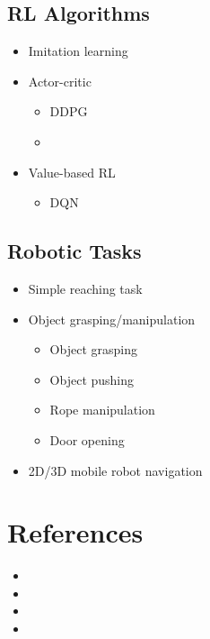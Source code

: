 \subsection{RL Algorithms}
\begin{itemize}
	\item Imitation learning \cite{pathak2018zero}
	\item Actor-critic
	\begin{itemize}
		\item DDPG \cite{andrychowicz2017hindsight}
		\item \cite{chane2021goal}
	\end{itemize}
	\item Value-based RL
	\begin{itemize}
		\item DQN \cite{andrychowicz2017hindsight, nair2018visual}
	\end{itemize}
\end{itemize}

\subsection{Robotic Tasks}
\begin{itemize}
	\item Simple reaching task
	\item Object grasping/manipulation
	\begin{itemize}
		\item Object grasping \cite{andrychowicz2017hindsight, nair2018visual}
		\item Object pushing \cite{andrychowicz2017hindsight, nair2018visual, chane2021goal}
		\item Rope manipulation \cite{pathak2018zero}
		\item Door opening \cite{nair2018visual}
	\end{itemize}
	\item 2D/3D mobile robot navigation \cite{pathak2018zero, chane2021goal}
\end{itemize}

\section{References}
\begin{itemize}
	\item {}
	\item {}
	\item {}
	\item {}
\end{itemize}

